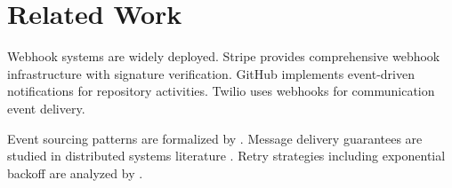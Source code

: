 \section{Related Work}


Webhook systems are widely deployed. Stripe \cite{stripe2019} provides comprehensive webhook infrastructure with signature verification. GitHub \cite{github2019} implements event-driven notifications for repository activities. Twilio \cite{twilio2019} uses webhooks for communication event delivery.

Event sourcing patterns are formalized by \cite{fowler2005}. Message delivery guarantees are studied in distributed systems literature \cite{birman1987}. Retry strategies including exponential backoff are analyzed by \cite{rajagopalan2002}.


